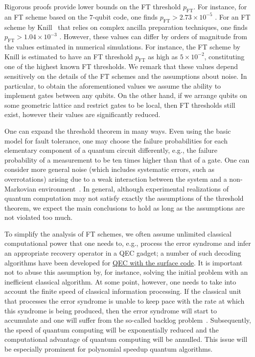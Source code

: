 \begin{refsection}
Rigorous proofs provide lower bounds on the FT threshold $p_\text{FT}$.
For instance, for an FT scheme based on the $7$-qubit code, one finds $p_\text{FT} > 2.73\times 10^{-5}$ \cite{aliferis2006quantum}.
For an FT scheme by Knill~\cite{knill2005QCwithNoisyDevices} that relies on complex ancilla preparation techniques, one finds $p_\text{FT} > 1.04\times 10^{-3}$ \cite{aliferis2008AccuracyThresholdPostselected}.
However, these values can differ by orders of magnitude from the values estimated in numerical simulations.
For instance, the FT scheme by Knill is estimated to have an FT threshold $p_\text{FT}$ as high as $5\times 10^{-2}$, constituting one of the highest known FT thresholds. 
We remark that these values depend sensitively on the details of the FT schemes and the assumptions about noise.
In particular, to obtain the aforementioned values we assume the ability to implement gates between any qubits.
On the other hand, if we arrange qubits on some geometric lattice and restrict gates to be local, then FT thresholds still exist, however their values are significantly reduced.

One can expand the threshold theorem in many ways.
Even using the basic model for fault tolerance, one may choose the failure probabilities for each elementary component of a quantum circuit differently, e.g., the failure probability of a measurement to be ten times higher than that of a gate. 
One can consider more general noise (which includes systematic errors, such as overrotations) arising due to a weak interaction between the system and a non-Markovian environment~\cite{aliferis2006quantum,terhal2005FTQCnonMarkovian}.
In general, although experimental realizations of quantum computation may not satisfy exactly the assumptions of the threshold theorem, we expect the main conclusions to hold as long as the assumptions are not violated too much.

To simplify the analysis of FT schemes, we often assume unlimited classical computational power that one needs to, e.g., process the error syndrome and infer an appropriate recovery operator in a QEC gadget; a number of such decoding algorithms have been developed for \hyperref[prim:QEC]{QEC with the surface code}.
It is important not to abuse this assumption by, for instance, solving the initial problem with an inefficient classical algorithm.
At some point, however, one needs to take into account the finite speed of classical information processing.
If the classical unit that processes the error syndrome is unable to keep pace with the rate at which this syndrome is being produced, then the error syndrome will start to accumulate and one will suffer from the so-called backlog problem~\cite{terhal2015QECforQuantumMemories}. 
Subsequently, the speed of quantum computing will be exponentially reduced and the computational advantage of quantum computing will be annulled.
This issue will be especially prominent for polynomial speedup quantum algorithms.




\end{refsection}
